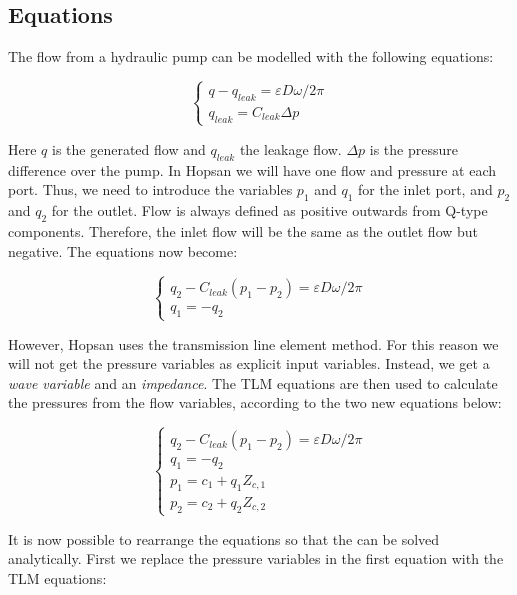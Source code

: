 \documentclass[a4paper,pdftex]{article}
\begin{document}
\subsection*{Equations}
The flow from a hydraulic pump can be modelled with the following equations:

\begin{equation*}
\begin{cases}
q - q_{leak} = \varepsilon D \omega/2\pi \\
q_{leak} = C_{leak}\Delta p
\end{cases}
\end{equation*}

Here $q$ is the generated flow and $q_{leak}$ the leakage flow. $\Delta p$ is the pressure difference over the pump. In Hopsan we will have one flow and pressure at each port. Thus, we need to introduce the variables $p_{1}$ and $q_{1}$ for the inlet port, and $p_{2}$ and $q_{2}$ for the outlet. Flow is always defined as positive outwards from Q-type components. Therefore, the inlet flow will be the same as the outlet flow but negative. The equations now become:

\begin{equation*}
\begin{cases}
q_{2} - C_{leak}(p_{1}-p_{2}) = \varepsilon D \omega/2\pi \\
q_{1} = -q_{2}
\end{cases}
\end{equation*}

However, Hopsan uses the transmission line element method. For this reason we will not get the pressure variables as explicit input variables. Instead, we get a \textit{wave variable} and an \textit{impedance}. The TLM equations are then used to calculate the pressures from the flow variables, according to the two new equations below:

\begin{equation*}
\begin{cases}
q_{2} - C_{leak}(p_{1}-p_{2}) = \varepsilon D \omega/2\pi \\
q_{1} = -q_{2}\\
p_{1} = c_{1} + q_{1}Z_{c,1}\\
p_{2} = c_{2} + q_{2}Z_{c,2}
\end{cases}
\end{equation*}

It is now possible to rearrange the equations so that the can be solved analytically. First we replace the pressure variables in the first equation with the TLM equations:
\end{document}
